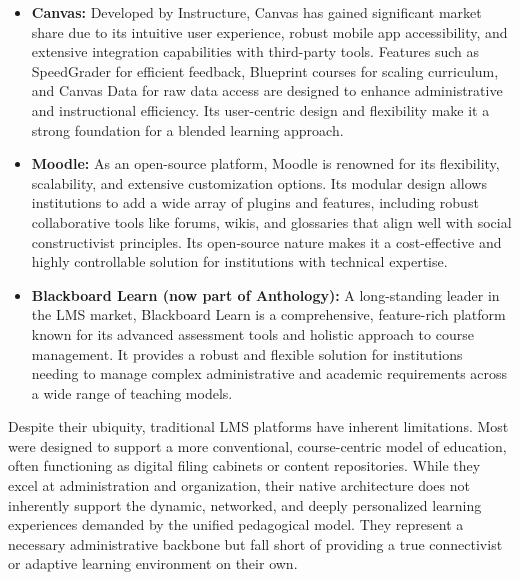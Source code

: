 \documentclass{article}
\begin{document}
\begin{itemize}
    \item \textbf{Canvas:} Developed by Instructure, Canvas has gained significant market share due to its intuitive user experience, robust mobile app accessibility, and extensive integration capabilities with third-party tools.\cite{28, 29} Features such as SpeedGrader for efficient feedback, Blueprint courses for scaling curriculum, and Canvas Data for raw data access are designed to enhance administrative and instructional efficiency.\cite{29} Its user-centric design and flexibility make it a strong foundation for a blended learning approach.\cite{28}
    \item \textbf{Moodle:} As an open-source platform, Moodle is renowned for its flexibility, scalability, and extensive customization options.\cite{28, 30} Its modular design allows institutions to add a wide array of plugins and features, including robust collaborative tools like forums, wikis, and glossaries that align well with social constructivist principles.\cite{28, 30} Its open-source nature makes it a cost-effective and highly controllable solution for institutions with technical expertise.\cite{28}
    \item \textbf{Blackboard Learn (now part of Anthology):} A long-standing leader in the LMS market, Blackboard Learn is a comprehensive, feature-rich platform known for its advanced assessment tools and holistic approach to course management.\cite{27, 28} It provides a robust and flexible solution for institutions needing to manage complex administrative and academic requirements across a wide range of teaching models.\cite{28}
\end{itemize}

Despite their ubiquity, traditional LMS platforms have inherent limitations. Most were designed to support a more conventional, course-centric model of education, often functioning as digital filing cabinets or content repositories.\cite{31} While they excel at administration and organization, their native architecture does not inherently support the dynamic, networked, and deeply personalized learning experiences demanded by the unified pedagogical model. They represent a necessary administrative backbone but fall short of providing a true connectivist or adaptive learning environment on their own.\cite{32}
\end{document}
